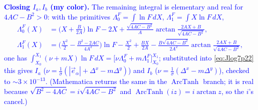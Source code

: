 \documentclass[11pt]{article}
\numberwithin{equation}{section}
\newcommand{\vv}[1]{\vec{#1}}
\newcommand{\cam}[1]{\textcolor{blue}{#1}}
\begin{document}
\cam{\textbf{Closing $I_a,I_b$ (my color).} The remaining integral is elementary and
real for $4AC-B^2>0$: with the primitives $\Lambda_0^F=\int\ln F\,dX$, $\Lambda_1^F=\int X\ln F\,dX$,
\begin{align*}
  \Lambda_0^F(X)&=\Big(X+\tfrac{B}{2A}\Big)\ln F-2X+\tfrac{\sqrt{4AC-B^2}}{A}\arctan\tfrac{2AX+B}{\sqrt{4AC-B^2}},\\
  \Lambda_1^F(X)&=\Big(\tfrac{X^2}{2}-\tfrac{B^2-2AC}{4A^2}\Big)\ln F-\tfrac{X^2}{2}+\tfrac{BX}{2A}
    -\tfrac{B\sqrt{4AC-B^2}}{2A^2}\arctan\tfrac{2AX+B}{\sqrt{4AC-B^2}},
\end{align*}
one has $\int_{X_0}^{X_1}(\nu+mX)\ln F\,dX=\big[\nu\Lambda_0^F+m\Lambda_1^F\big]_{X_0}^{X_1}$; substituted
into \eqref{eq:Jlog7p22} this gives $I_a$ ($\nu=\tfrac1\sigma(|\vv e_\alpha|+\Delta^x-m\Delta^y)$) and
$I_b$ ($\nu=\tfrac1\sigma(\Delta^x-m\Delta^y)$), checked to $\sim3\times10^{-13}$. (Mathematica returns
the same in the $\operatorname{ArcTanh}$ branch; it is real because $\sqrt{B^2-4AC}=i\sqrt{4AC-B^2}$ and
$\operatorname{ArcTanh}(iz)=i\arctan z$, so the $i$'s cancel.)}
\end{document}
